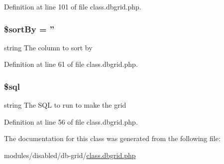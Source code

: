 Definition at line 101 of file class.\-dbgrid.\-php.

\hypertarget{class_db_grid_ae4a5f363089eeaaa9f463a99c6503bcb}{
\subsubsection[{\$sort\-By}]{\setlength{\rightskip}{0pt plus 5cm}\$sort\-By = ''\hspace{0.3cm}{\ttfamily [protected]}}}\label{class_db_grid_ae4a5f363089eeaaa9f463a99c6503bcb}
string The column to sort by 

Definition at line 61 of file class.\-dbgrid.\-php.

\hypertarget{class_db_grid_a047170d6020a882807665812a27e2525}{
\subsubsection[{\$sql}]{\setlength{\rightskip}{0pt plus 5cm}\$sql\hspace{0.3cm}{\ttfamily [protected]}}}\label{class_db_grid_a047170d6020a882807665812a27e2525}
string The S\-Q\-L to run to make the grid 

Definition at line 56 of file class.\-dbgrid.\-php.



The documentation for this class was generated from the following file\-:\begin{DoxyCompactItemize}
\item 
modules/disabled/db-\/grid/\hyperlink{class_8dbgrid_8php}{class.\-dbgrid.\-php}\end{DoxyCompactItemize}
